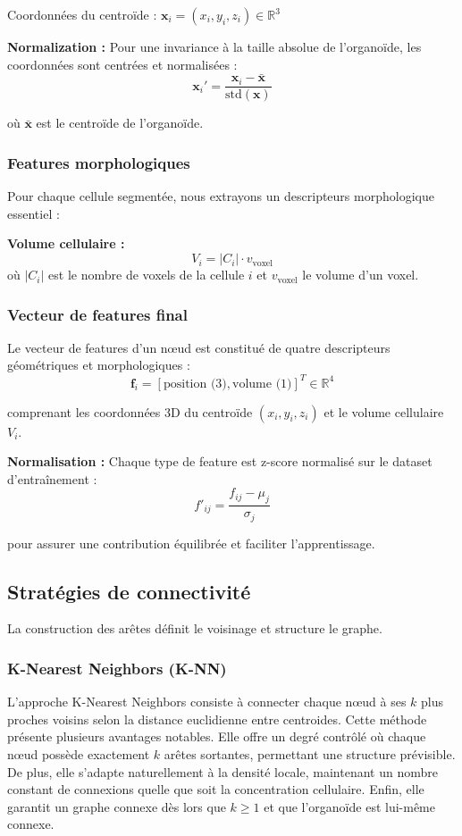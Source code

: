 Coordonnées du centroïde : $\mathbf{x}_i = (x_i, y_i, z_i) \in \mathbb{R}^3$

\textbf{Normalization :}
Pour une invariance à la taille absolue de l'organoïde, les coordonnées sont centrées et normalisées :
\[
\mathbf{x}_i' = \frac{\mathbf{x}_i - \bar{\mathbf{x}}}{\text{std}(\mathbf{x})}
\]

où $\bar{\mathbf{x}}$ est le centroïde de l'organoïde.

\subsubsection{Features morphologiques}

Pour chaque cellule segmentée, nous extrayons un descripteurs morphologique essentiel :

\textbf{Volume cellulaire :}
\[
V_i = |C_i| \cdot v_{\text{voxel}}
\]
où $|C_i|$ est le nombre de voxels de la cellule $i$ et $v_{\text{voxel}}$ le volume d'un voxel.


\subsubsection{Vecteur de features final}

Le vecteur de features d'un nœud est constitué de quatre descripteurs géométriques et morphologiques :
\[
\mathbf{f}_i = [\text{position (3)}, \text{volume (1)}]^T \in \mathbb{R}^{4}
\]

comprenant les coordonnées 3D du centroïde $(x_i, y_i, z_i)$ et le volume cellulaire $V_i$.

\textbf{Normalisation :}
Chaque type de feature est z-score normalisé sur le dataset d'entraînement :
\[
f'_{ij} = \frac{f_{ij} - \mu_j}{\sigma_j}
\]

pour assurer une contribution équilibrée et faciliter l'apprentissage.

\subsection{Stratégies de connectivité}

La construction des arêtes définit le voisinage et structure le graphe.

\subsubsection{K-Nearest Neighbors (K-NN)}

L'approche K-Nearest Neighbors consiste à connecter chaque nœud à ses $k$ plus proches voisins selon la distance euclidienne entre centroides. Cette méthode présente plusieurs avantages notables. Elle offre un degré contrôlé où chaque nœud possède exactement $k$ arêtes sortantes, permettant une structure prévisible. De plus, elle s'adapte naturellement à la densité locale, maintenant un nombre constant de connexions quelle que soit la concentration cellulaire. Enfin, elle garantit un graphe connexe dès lors que $k \geq 1$ et que l'organoïde est lui-même connexe.


